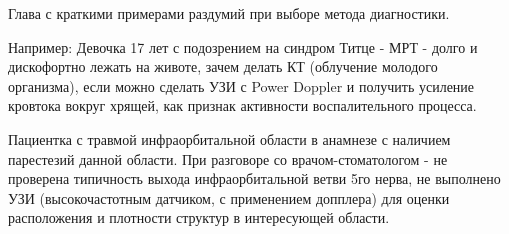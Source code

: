 Глава с краткими примерами раздумий при выборе метода диагностики.

Например:
Девочка 17 лет с подозрением на синдром Титце - МРТ - долго и дискофортно лежать на животе, зачем делать КТ (облучение молодого организма), если можно сделать УЗИ с Power Doppler и получить усиление кровтока вокруг хрящей, как признак активности воспалительного процесса.

Пациентка с травмой инфраорбитальной области в анамнезе с наличием парестезий данной области. При разговоре со врачом-стоматологом - не проверена типичность выхода инфраорбитальной ветви 5го нерва, не выполнено УЗИ (высокочастотным датчиком, с применением допплера) для оценки расположения и плотности структур в интересующей области.